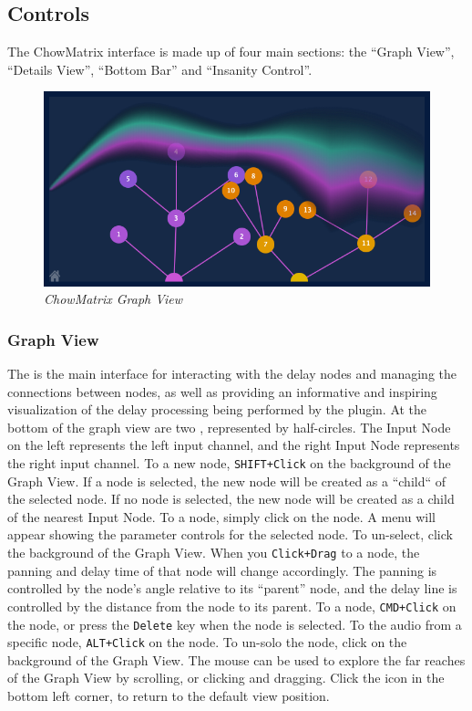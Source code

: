 \documentclass[landscape,twocolumn,a5paper]{manual}
\newcommand\shortcut[1]{\colorbox{highlightcolour}{\texttt{#1}}}
\begin{document}
\subsection{Controls}
The ChowMatrix interface is made up of four main sections:
the ``Graph View'', ``Details View'', ``Bottom Bar''
and ``Insanity Control''.

\begin{figure}[ht]
    \center
    \includegraphics[width=0.8\columnwidth]{screenshots/GraphView.png}
    \caption{\label{fig:graph_view}{\it ChowMatrix Graph View}}
\end{figure}

\subsubsection{Graph View}
The  is the main interface for interacting
with the delay nodes and managing the connections between nodes,
as well as providing an informative and inspiring visualization
of the delay processing being performed by the plugin.
\newpar
At the bottom of the graph view are two ,
represented by half-circles. The Input Node on the left represents
the left input channel, and the right Input Node represents the right
input channel.
\newpar
To  a new
node, \shortcut{SHIFT+Click} on the background of the Graph
View. If a node is selected, the new node will be created
as a ``child`` of the selected node. If no node is selected,
the new node will be created as a child of the nearest Input
Node.
\newpar
To  a node, simply click on the node. A menu
will appear showing the parameter controls for the selected node.
To un-select, click the background of the Graph View.
\newpar
When you \shortcut{Click+Drag} to  a node,
the panning and delay time of that node will change accordingly.
The panning is controlled by the node's angle relative to its
``parent'' node, and the delay line is controlled by the distance
from the node to its parent.
\newpar
To  a node,
\shortcut{CMD+Click} on the node, or press the \shortcut{Delete}
key when the node is selected.
\newpar
To  the audio from a specific node,
\shortcut{ALT+Click} on the node. To un-solo the node,
click on the background of the Graph View.
\newpar
The mouse can be used to explore the far reaches of the
Graph View by scrolling, or clicking and dragging. Click
the  icon in the bottom left corner, to
return to the default view position.
\end{document}
